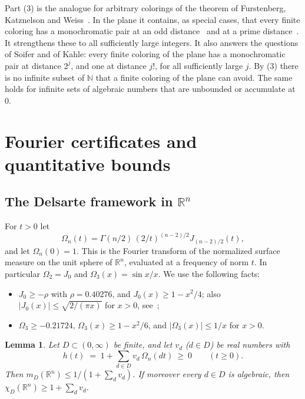 \documentclass[11pt]{amsart}
\newtheorem{lemma}[theorem]{Lemma}
\theoremstyle{definition}
\newcommand{\R}{\mathbb{R}}
\begin{document}
Part (3) is the analogue for arbitrary colorings of the theorem of Furstenberg, Katznelson and Weiss~\cite{FKW}. In the plane it contains, as special cases, that every finite coloring has a monochromatic pair at an odd distance~\cite{DaviesOdd} and at a prime distance~\cite{DMP}. It strengthens these to all sufficiently large integers. It also answers the questions of Soifer and of Kahle: every finite coloring of the plane has a monochromatic pair at distance $2^j$, and one at distance $j!$, for all sufficiently large $j$. By (3) there is no infinite subset of $\mathbb N$ that a finite coloring of the plane can avoid. The same holds for infinite sets of algebraic numbers that are unbounded or accumulate at $0$.


\section{Fourier certificates and quantitative bounds}\label{sec:quant}

\subsection{The Delsarte framework in \texorpdfstring{$\R^n$}{Rn}}

For $t>0$ let
\[
\Omega_n(t)=\Gamma(n/2)\,(2/t)^{(n-2)/2}J_{(n-2)/2}(t),
\]
and let $\Omega_n(0)=1$. This is the Fourier transform of the normalized surface measure on the unit sphere of $\R^n$, evaluated at a frequency of norm $t$. In particular $\Omega_2=J_0$ and $\Omega_3(x)=\sin x/x$. We use the following facts:
\begin{itemize}
\item $J_0\ge-\rho$ with $\rho=0.40276$, and $J_0(x)\ge1-x^2/4$; also $|J_0(x)|\le\sqrt{2/(\pi x)}$ for $x>0$, see~\cite[\S13.74]{Watson};
\item $\Omega_3\ge-0.21724$, $\Omega_3(x)\ge1-x^2/6$, and $|\Omega_3(x)|\le1/x$ for $x>0$.
\end{itemize}

\begin{lemma}\label{lem:delsarte}
Let $D\subset(0,\infty)$ be finite, and let $v_d$ ($d\in D$) be real numbers with
\begin{equation}\label{eq:LPcert}
h(t)\;=\;1+\sum_{d\in D}v_d\,\Omega_n(dt)\ \ge\ 0\qquad(t\ge0).
\end{equation}
Then $m_D(\R^n)\le 1/(1+\sum_d v_d)$. If moreover every $d\in D$ is algebraic, then $\chi_D(\R^n)\ge1+\sum_dv_d$.
\end{lemma}
\end{document}
